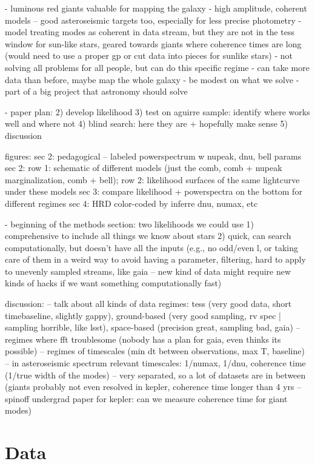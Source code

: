 \documentclass[modern]{aastex63}
\begin{document}
- luminous red giants valuable for mapping the galaxy
- high amplitude, coherent models -- good asteroseismic targets too, especially for less precise photometry
- model treating modes as coherent in data stream, but they are not in the tess window for sun-like stars, geared towards giants where coherence times are long (would need to use a proper gp or cut data into pieces for sunlike stars)
- not solving all problems for all people, but can do this specific regime
- can take more data than before, maybe map the whole galaxy
- be modest on what we solve
- part of a big project that astronomy should solve

- paper plan:
2) develop likelihood
3) test on aguirre sample: identify where works well and where not
4) blind search: here they are + hopefully make sense
5) discussion


figures:
sec 2: pedagogical -- labeled powerspectrum w nupeak, dnu, bell params 
sec 2: row 1: schematic of different models (just the comb, comb + nupeak marginalization, comb + bell); row 2: likelihood surfaces of the same lightcurve under these models
sec 3: compare likelihood + powerspectra on the bottom for different regimes
sec 4: HRD color-coded by inferre dnu, numax, etc


- beginning of the methods section: two likelihoods we could use
1) comprehensive to include all things we know about stars
2) quick, can search computationally, but doesn't have all the inputs (e.g., no odd/even l, or taking care of them in a weird way to avoid having a parameter, filtering, hard to apply to unevenly sampled streams, like gaia -- new kind of data might require new kinds of hacks if we want something computationally fast)


discussion:
-- talk about all kinds of data regimes: tess (very good data, short timebaseline, slightly gappy), ground-based (very good sampling, rv spec | sampling horrible, like lsst), space-based (precision great, sampling bad, gaia) -- regimes where fft troublesome (nobody has a plan for gaia, even thinks its possible)
-- regimes of timescales (min dt between observations, max T, baseline)
-- in asteroseismic spectrum relevant timescales: 1/numax, 1/dnu, coherence time (1/true width of the modes) -- very separated, so a lot of datasets are in between (giants probably not even resolved in kepler, coherence time longer than 4 yrs -- spinoff undergrad paper for kepler: can we measure coherence time for giant modes)


\section{Data}\label{sec:data}
\end{document}
